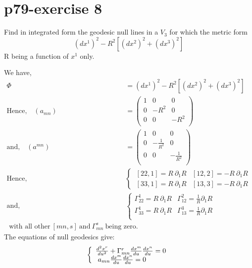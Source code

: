 \section{p79-exercise 8}
\begin{tcolorbox}
Find in integrated form the geodesic null lines in a $V_3$ for which the metric form $$(dx^1)^2 -R^2[(dx^2)^2+(dx^3)^2]$$
R being a function of $x^1$ only.
\end{tcolorbox}
We have,
\begin{align}
\Phi &= (dx^1)^2 -R^2[(dx^2)^2+(dx^3)^2]\\
\text{Hence,}\quad (a_{mn}) &= \begin{pmatrix}
 1&0  & 0 \\
 0& -R^2 & 0 \\
 0& 0 &  -R^2 \\
\end{pmatrix}\\
\text{and,}\quad (a^{mn}) &= \begin{pmatrix}
 1&0  & 0 \\
 0& -\frac{1}{R^2} & 0 \\
 0& 0 &  -\frac{1}{R^2} \\
\end{pmatrix}\\
\text{Hence,}\quad & \left \{ \begin{array}{ll}
\ [22,1] = R \ \partial_1 R &[12,2] = -R \ \partial_1 R\\
\ [33,1] = R \ \partial_1 R & [13,3] = -R \ \partial_1 R
\end{array} \right.\\
\text{and,}\quad & \left \{ \begin{array}{ll}
\Gamma^1_{22}  = R \ \partial_1 R &\Gamma^2_{12}  = \frac{1}{R}\partial_1 R \\
\Gamma^1_{33}  = R \ \partial_1 R &\Gamma^3_{13}  = \frac{1}{R}\partial_1 R \\
\end{array} \right.\\
\text{ with all other} \ [mn,s] \ \text{and}\ \Gamma^s_{mn} \ \text{being zero.}
\end{align}
The equations of null geodesics give:
\begin{align}
\left \{ \begin{array}{l}
\dv[2] {x^r}{u} + \Gamma^r_{mn}\dv{x^m}{u}\dv{x^n}{u} = 0\\
\ a_{mn}\dv{x^m}{u}\dv{x^n}{u} = 0 \end{array}\right.
\end{align}
